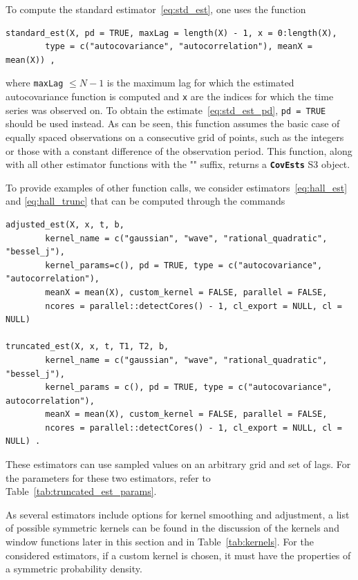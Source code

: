To compute the standard estimator~\eqref{eq:std_est}, one uses the
function

\begin{verbatim}
standard_est(X, pd = TRUE, maxLag = length(X) - 1, x = 0:length(X),
        type = c("autocovariance", "autocorrelation"), meanX = mean(X)) ,
\end{verbatim}

where \texttt{maxLag} \(\leq N - 1\) is the maximum lag for which the
estimated autocovariance function is computed and \texttt{x} are the
indices for which the time series was observed on. To obtain the
estimate~\eqref{eq:std_est_pd}, \texttt{pd\ =\ TRUE} should be used
instead. As can be seen, this function assumes the basic case of equally
spaced observations on a consecutive grid of points, such as the
integers or those with a constant difference of the observation period.
This function, along with all other estimator functions with the
"" suffix, returns a \textbf{\texttt{CovEsts}} S3 object.

To provide examples of other function calls, we consider
estimators~\eqref{eq:hall_est} and \eqref{eq:hall_trunc} that can be
computed through the commands

\begin{verbatim}
adjusted_est(X, x, t, b,
        kernel_name = c("gaussian", "wave", "rational_quadratic", "bessel_j"),
        kernel_params=c(), pd = TRUE, type = c("autocovariance", "autocorrelation"),
        meanX = mean(X), custom_kernel = FALSE, parallel = FALSE,
        ncores = parallel::detectCores() - 1, cl_export = NULL, cl = NULL) 

truncated_est(X, x, t, T1, T2, b,
        kernel_name = c("gaussian", "wave", "rational_quadratic", "bessel_j"),
        kernel_params = c(), pd = TRUE, type = c("autocovariance", autocorrelation"),
        meanX = mean(X), custom_kernel = FALSE, parallel = FALSE,
        ncores = parallel::detectCores() - 1, cl_export = NULL, cl = NULL) .
\end{verbatim}

These estimators can use sampled values on an arbitrary grid and set of
lags. For the parameters for these two estimators, refer to
Table~\ref{tab:truncated_est_params}.

As several estimators include options for kernel smoothing and
adjustment, a list of possible symmetric kernels can be found in the
discussion of the kernels and window functions later in this section and
in Table~\ref{tab:kernels}. For the considered estimators, if a custom
kernel is chosen, it must have the properties of a symmetric probability
density.

